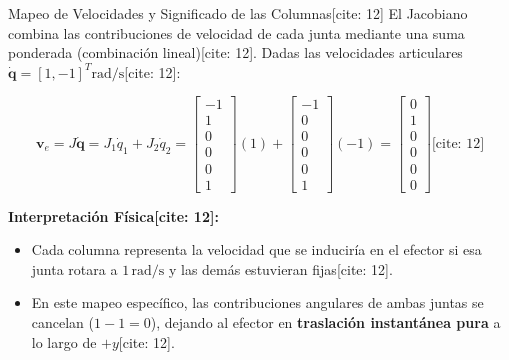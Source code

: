 \documentclass[aspectratio=169, xcolor={table,xcdraw}]{beamer}
\begin{document}
\begin{frame}{Mapeo de Velocidades y Significado de las Columnas[cite: 12]}
    El Jacobiano combina las contribuciones de velocidad de cada junta mediante una suma ponderada (combinación lineal)[cite: 12]. Dadas las velocidades articulares $\dot{\mathbf{q}} = [1, -1]^T \mathrm{rad/s}$[cite: 12]:
    
    {\footnotesize
    \begin{equation*}
        \mathbf{v}_e = J\dot{\mathbf{q}} = J_1 \dot{q}_1 + J_2 \dot{q}_2 = \begin{bmatrix} -1 \\ 1 \\ 0 \\ 0 \\ 0 \\ 1 \end{bmatrix}(1) + \begin{bmatrix} -1 \\ 0 \\ 0 \\ 0 \\ 0 \\ 1 \end{bmatrix}(-1) = \boxed{ \begin{bmatrix} 0 \\ 1 \\ 0 \\ 0 \\ 0 \\ 0 \end{bmatrix} } \text{[cite: 12]}
    \end{equation*}
    }
    
    \textbf{Interpretación Física[cite: 12]:}
    \begin{itemize}
        \item Cada columna representa la velocidad que se induciría en el efector si esa junta rotara a $1\,\mathrm{rad/s}$ y las demás estuvieran fijas[cite: 12].
        \item En este mapeo específico, las contribuciones angulares de ambas juntas se cancelan ($1 - 1 = 0$), dejando al efector en \textbf{traslación instantánea pura} a lo largo de $+y$[cite: 12].
    \end{itemize}
\end{frame}
\end{document}

